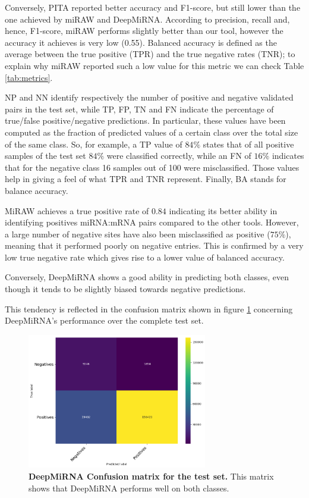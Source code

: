 Conversely, PITA reported better accuracy and F1-score, but still lower than the one achieved by miRAW and DeepMiRNA. According to precision, recall and, hence, F1-score, miRAW performs slightly better than our tool, however the accuracy it achieves is very low (0.55). Balanced accuracy is defined as the average between the true positive (TPR) and the true negative rates (TNR); to explain why miRAW reported such a low value for this metric we can check Table \ref{tab:metrics}.

NP and NN identify respectively the number of positive and negative validated pairs in the test set, while TP, FP, TN and FN indicate the percentage of true/false positive/negative predictions. 
In particular, these values have been computed as the fraction of predicted values of a certain class over the total size of the same class. So, for example, a TP value of $84\%$ states that of all positive samples of the test set $84\%$ were classified correctly, while an FN of $16\%$ indicates that for the negative class 16 samples out of 100 were misclassified. Those values help in giving a feel of what TPR and TNR represent. Finally, BA stands for balance accuracy.
 
MiRAW achieves a true positive rate of $0.84$ indicating its better ability in identifying positives miRNA:mRNA pairs compared to the other tools. However, a large number of negative sites have also been misclassified as positive ($75\%$), meaning that it performed poorly on negative entries. This is confirmed by a very low true negative rate which gives rise to a lower value of balanced accuracy.

Conversely, DeepMiRNA shows a good ability in predicting both classes, even though it tends to be slightly biased towards negative predictions. 

This tendency is reflected in the confusion matrix shown in figure \ref{fig:confusion_matrix} concerning DeepMiRNA's performance over the complete test set.

\begin{figure}[h!]
	\centering
	\includegraphics[width=0.7\textwidth, height=0.4\textheight]{Figures/conf_matrix}
	\caption{\textbf{DeepMiRNA Confusion matrix for the test set.} This matrix shows that DeepMiRNA performs well on both classes.}
	\label{fig:confusion_matrix}
\end{figure} 
  


 